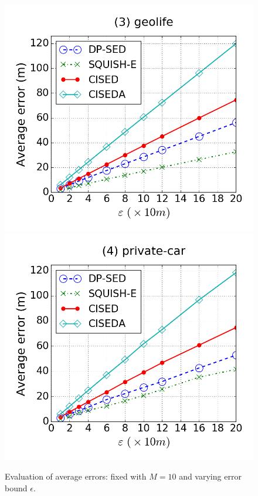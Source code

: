 {\begin{figure}[tb]
\includegraphics[scale = 0.245]{figures/Exp-error-epsilon-geolife.png}
\includegraphics[scale = 0.245]{figures/Exp-error-epsilon-private.png}
\vspace{-3ex}
\caption{\small Evaluation of average errors: fixed with $M=10$ and varying error bound $\epsilon$.}
\label{fig:ae-m10}
\vspace{-1ex}
\end{figure}
}



